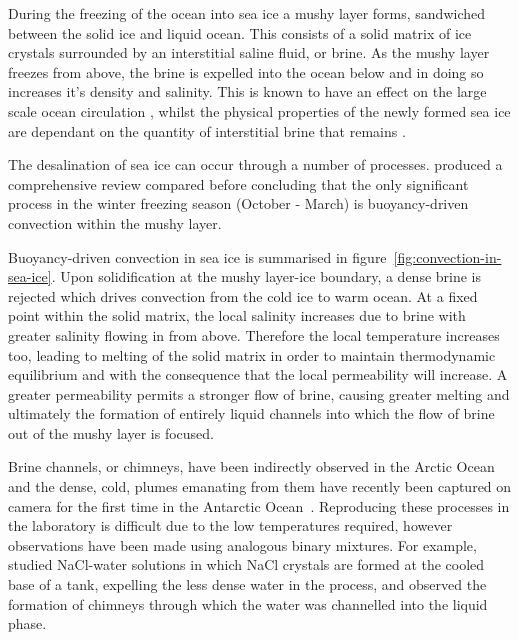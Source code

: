 \documentclass[11pt]{proc}
\begin{document}
During the freezing of the ocean into sea ice a mushy layer forms, sandwiched between the solid ice and liquid ocean. This consists of a solid matrix of ice crystals surrounded by an interstitial saline fluid, or brine. As the mushy layer freezes from above, the brine is expelled into the ocean below and in doing so increases it's density and salinity. This is known to have an effect on the large scale ocean circulation \citep*{brandon-et-al-10}, whilst the physical properties of the newly formed sea ice are dependant on the quantity of interstitial brine that remains \citep*{petrich-eicken-10}. 

The desalination of sea ice can occur through a number of processes. \citet*{notz-worster-09} produced a comprehensive review compared before concluding that the only significant process in the winter freezing season (October - March) is buoyancy-driven convection within the mushy layer.

Buoyancy-driven convection in sea ice is summarised in figure~\ref{fig:convection-in-sea-ice}. Upon solidification at the mushy layer-ice boundary, a dense brine is rejected which drives convection from the cold ice to warm ocean. At a fixed point within the solid matrix, the local salinity increases due to brine with greater salinity flowing in from above. Therefore the local temperature increases too, leading to melting of the solid matrix in order to maintain thermodynamic equilibrium and with the consequence that the local permeability will increase. A greater permeability permits a stronger flow of brine, causing greater melting and ultimately the formation of entirely liquid channels into which the flow of brine out of the mushy layer is focused. 

Brine channels, or chimneys, have been indirectly observed in the Arctic Ocean \citep*{wettlaufer-et-al-00} and the dense, cold, plumes emanating from them have recently been captured on camera for the first time in the Antarctic Ocean~\citep*{frozen-planet-11}. Reproducing these processes in the laboratory is difficult due to the low temperatures required, however observations have been made using analogous binary mixtures. For example,~\citet*{wettlaufer-et-al-97} studied NaCl-water solutions in which NaCl crystals are formed at the cooled base of a tank, expelling the less dense water in the process, and observed the formation of chimneys through which the water was channelled into the liquid phase.
\end{document}
